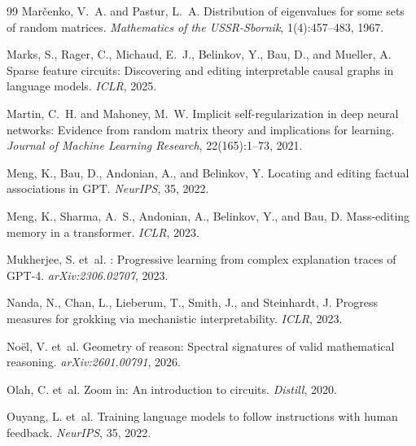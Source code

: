 \documentclass{article}
\begin{document}
\begin{thebibliography}{99}
Mar\v{c}enko, V.~A. and Pastur, L.~A.
\newblock Distribution of eigenvalues for some sets of random matrices.
\newblock \emph{Mathematics of the {USSR-Sbornik}}, 1(4):457--483, 1967.

Marks, S., Rager, C., Michaud, E.~J., Belinkov, Y., Bau, D., and
 Mueller, A.
\newblock Sparse feature circuits: Discovering and editing
 interpretable causal graphs in language models.
\newblock \emph{ICLR}, 2025.

Martin, C.~H. and Mahoney, M.~W.
\newblock Implicit self-regularization in deep neural networks:
 Evidence from random matrix theory and implications for learning.
\newblock \emph{Journal of Machine Learning Research},
 22(165):1--73, 2021.

Meng, K., Bau, D., Andonian, A., and Belinkov, Y.
\newblock Locating and editing factual associations in {GPT}.
\newblock \emph{NeurIPS}, 35, 2022.

Meng, K., Sharma, A.~S., Andonian, A., Belinkov, Y., and Bau, D.
\newblock Mass-editing memory in a transformer.
\newblock \emph{ICLR}, 2023.

Mukherjee, S. et~al.
: Progressive learning from complex explanation traces
 of {GPT-4}.
\newblock \emph{arXiv:2306.02707}, 2023.

Nanda, N., Chan, L., Lieberum, T., Smith, J., and Steinhardt, J.
\newblock Progress measures for grokking via mechanistic interpretability.
\newblock \emph{ICLR}, 2023.

No\"el, V. et~al.
\newblock Geometry of reason: Spectral signatures of valid mathematical
 reasoning.
\newblock \emph{arXiv:2601.00791}, 2026.

Olah, C. et~al.
\newblock Zoom in: An introduction to circuits.
\newblock \emph{Distill}, 2020.

Ouyang, L. et~al.
\newblock Training language models to follow instructions with human
 feedback.
\newblock \emph{NeurIPS}, 35, 2022.


\end{thebibliography}
\end{document}
